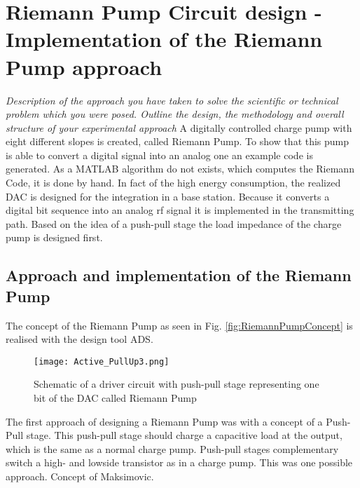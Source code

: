\chapter{Riemann Pump Circuit design - Implementation of the Riemann Pump approach}

\label{ch:design}
\textit{Description of the approach you have taken to solve the scientific or technical problem which you were posed. Outline the design, the methodology and overall structure of your experimental approach}
A digitally controlled charge pump with eight different slopes is created, called Riemann Pump. To show that this pump is able to convert a digital signal into an analog one an example code is generated. As a MATLAB algorithm do not exists, which computes the Riemann Code, it is done by hand.
In fact of the high energy consumption, the realized DAC is designed for the integration in a base station. Because it converts a digital bit sequence into an analog rf signal it is implemented in the transmitting path. Based on the idea of a push-pull stage the load impedance of the charge pump is designed first.
\section{Approach and implementation of the Riemann Pump}
The concept of the Riemann Pump as seen in Fig. \ref{fig:RiemannPumpConcept} is realised with the design tool ADS.

\begin{figure}[ht]
	\centering
  \texttt{[image: Active\_PullUp3.png]}
	\caption{Schematic of a driver circuit with push-pull stage representing one bit of the DAC called Riemann Pump}
	\label{RiemannPump}
\end{figure}

The first approach of designing a Riemann Pump was with a concept of a Push-Pull stage. This push-pull stage should charge a capacitive load at the output, which is the same as a normal charge pump. Push-pull stages complementary switch a high- and lowside transistor as in a charge pump. This was one possible approach. Concept of Maksimovic. 
